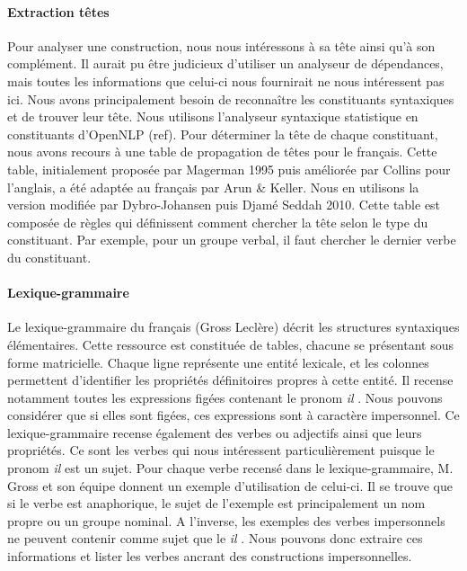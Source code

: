 \documentclass[a4paper,12pt]{article}
\begin{document}
\paragraph{Extraction têtes}
Pour analyser une construction, nous nous intéressons à sa tête ainsi qu'à son complément. Il aurait pu être judicieux d'utiliser un analyseur de dépendances, mais toutes les informations que celui-ci nous fournirait ne nous intéressent pas ici. Nous avons principalement besoin de reconnaître les constituants syntaxiques et de trouver leur tête. Nous utilisons l'analyseur syntaxique statistique en constituants d'OpenNLP (ref). Pour déterminer la tête de chaque constituant, nous avons recours à une table de propagation de têtes pour le français. Cette table, initialement proposée par Magerman 1995 puis améliorée par Collins pour l'anglais, a été adaptée au français par Arun & Keller. Nous en utilisons la version modifiée par Dybro-Johansen puis Djamé Seddah 2010. Cette table est composée de règles qui définissent comment chercher la tête selon le type du constituant. Par exemple, pour un groupe verbal, il faut chercher le dernier verbe du constituant.

\paragraph{Lexique-grammaire}
Le lexique-grammaire du français (Gross Leclère) décrit les structures syntaxiques élémentaires. Cette ressource est constituée de tables, chacune se présentant sous forme matricielle. Chaque ligne représente une entité lexicale, et les colonnes permettent d'identifier les propriétés définitoires propres à cette entité. Il recense notamment toutes les expressions figées contenant le pronom \og \textit{il} \fg{}. Nous pouvons considérer que si elles sont figées, ces expressions sont à caractère impersonnel. Ce lexique-grammaire recense également des verbes ou adjectifs ainsi que leurs propriétés. Ce sont les verbes qui nous intéressent particulièrement puisque le pronom \og \textit{il} \fg{} est un sujet. Pour chaque verbe recensé dans le lexique-grammaire, M. Gross et son équipe donnent un exemple d'utilisation de celui-ci. Il se trouve que si le verbe est anaphorique, le sujet de l'exemple est principalement un nom propre ou un groupe nominal. A l'inverse, les exemples des verbes impersonnels ne peuvent contenir comme sujet que le \og \textit{il} \fg{}. Nous pouvons donc extraire ces informations et lister les verbes ancrant des constructions impersonnelles.
\end{document}
